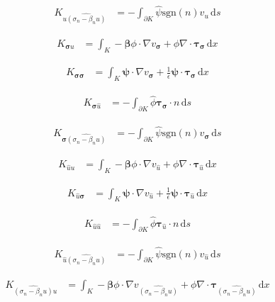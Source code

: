\documentclass[a4paper]{article}
\def\d{\,\mathrm{d}}
\def\dx{\d x}
\def\ds{\d s}
\def\btau{\boldsymbol\tau}
\def\bsigma{\boldsymbol\sigma}
\def\bbeta{\boldsymbol\beta}
\def\bpsi{\boldsymbol\psi}
\begin{document}
\begin{align*}
K_{u\widehat{(\sigma_n-\beta_nu)}}&=-\int_{\partial K}
\hat\psi\text{sgn}(n)v_u \ds
\end{align*}
\bigskip



\begin{align*}
K_{\bsigma u}&=\int_K
-\bbeta\phi\cdot\nabla v_{\bsigma}
+\phi\nabla\cdot\btau_{\bsigma} \dx
\end{align*}

\begin{align*}
K_{\bsigma\bsigma}&=\int_K
\bpsi\cdot\nabla v_{\bsigma}
+\frac{1}{\epsilon}\bpsi\cdot\btau_{\bsigma}\dx
\end{align*}

\begin{align*}
K_{\bsigma\hat u}&=-\int_{\partial K}
\hat\phi\btau_{\bsigma}\cdot n\ds
\end{align*}

\begin{align*}
K_{\bsigma\widehat{(\sigma_n-\beta_nu)}}&=-\int_{\partial K}
\hat\psi\text{sgn}(n)v_{\bsigma} \ds
\end{align*}
\bigskip



\begin{align*}
K_{\hat uu}&=\int_K
-\bbeta\phi\cdot\nabla v_{\hat u}
+\phi\nabla\cdot\btau_{\hat u} \dx
\end{align*}

\begin{align*}
K_{\hat u\bsigma}&=\int_K
\bpsi\cdot\nabla v_{\hat u}
+\frac{1}{\epsilon}\bpsi\cdot\btau_{\hat u}\dx
\end{align*}

\begin{align*}
K_{\hat u\hat u}&=-\int_{\partial K}
\hat\phi\btau_{\hat u}\cdot n\ds
\end{align*}

\begin{align*}
K_{\hat u\widehat{(\sigma_n-\beta_nu)}}&=-\int_{\partial K}
\hat\psi\text{sgn}(n)v_{\hat u} \ds
\end{align*}
\bigskip



\begin{align*}
K_{\widehat{(\sigma_n-\beta_nu)}u}&=\int_K
-\bbeta\phi\cdot\nabla v_{\widehat{(\sigma_n-\beta_nu)}}
+\phi\nabla\cdot\btau_{\widehat{(\sigma_n-\beta_nu)}} \dx
\end{align*}
\end{document}
